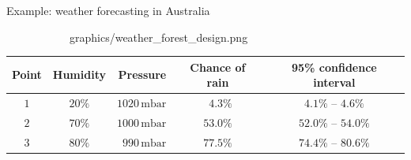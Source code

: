 \documentclass{beamer}
\begin{document}
\begin{frame}{Example: weather forecasting in Australia}
\begin{figure}
\begin{subfigure}{0.45\textwidth}
{      graphics/weather_forest_design.png}%
    \end{subfigure}
  \end{figure}

  \vspace*{-8mm}
  \footnotesize{
    \begin{table}
      \begin{center}
        \begin{tabular}{|c|c|r|c|c|}
          \hline
          \textbf{Point} & \textbf{Humidity} & \textbf{Pressure} &
          \textbf{Chance of rain} & \textbf{95\% confidence interval} \\
          \hline
          $1$ & $20\%$ & $1020\,\textrm{mbar}$ &
          \cellcolor{drycolor!40!white} $\phantom{0}4.3\%$ &
          \cellcolor{drycolor!40!white} \hspace*{-0mm}$4.1\%$ -- $4.6\%$ \\
          $2$ & $70\%$ & $1000\,\textrm{mbar}$ &
          \cellcolor{wetcolor!5!white} $53.0\%$ &
          \cellcolor{wetcolor!5!white} $52.0\%$ -- $54.0\%$ \\
          $3$ & $80\%$ & $990\,\textrm{mbar}$ &
          \cellcolor{wetcolor!30!white} $77.5\%$ &
          \cellcolor{wetcolor!30!white} $74.4\%$ -- $80.6\%$ \\
          \hline
        \end{tabular}
      \end{center}
    \end{table}
  }

\end{frame}
\end{document}
